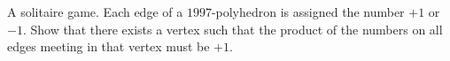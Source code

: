 A solitaire game. Each edge of a $1997$-polyhedron is assigned the number $+1$ or $-1$. Show that there exists a vertex such that the product of the numbers on all edges meeting in that vertex must be $+1$.
